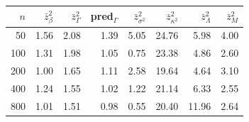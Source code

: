 
\begin{tabular}{rrrrrrrr}
\toprule
$n$ & $\bar{z}^2_{\beta}$ & $\bar{z}^2_{\Gamma}$ & pred$_{\Gamma}$ & $\bar{z}^2_{\sigma^2}$ & $\bar{z}^2_{\kappa^2}$ & $\bar{z}^2_{\Lambda}$ & $\bar{z}^2_{M}$\\
\midrule
50 & 1.56 & 2.08 & 1.39 & 5.05 & 24.76 & 5.98 & 4.00\\
100 & 1.31 & 1.98 & 1.05 & 0.75 & 23.38 & 4.86 & 2.60\\
200 & 1.00 & 1.65 & 1.11 & 2.58 & 19.64 & 4.64 & 3.10\\
400 & 1.24 & 1.55 & 1.02 & 1.22 & 21.14 & 6.33 & 2.55\\
800 & 1.01 & 1.51 & 0.98 & 0.55 & 20.40 & 11.96 & 2.64\\
\bottomrule
\end{tabular}

